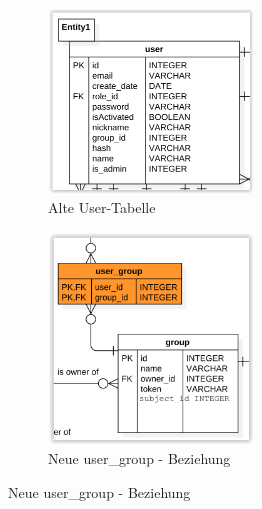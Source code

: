 \begin{figure}
	\centering
	\begin{subfigure}{.5\textwidth}
		\centering
		\includegraphics[width=0.6\textwidth]{Images/DB_User_Table.PNG}
		\caption{Alte User-Tabelle}
	\end{subfigure}%
	\begin{subfigure}{.5\textwidth}
		\centering
		\includegraphics[width=0.6\textwidth]{Images/DB_Group_Table.PNG}
		\caption{Neue user\_group - Beziehung}
	\end{subfigure}
\end{figure}



